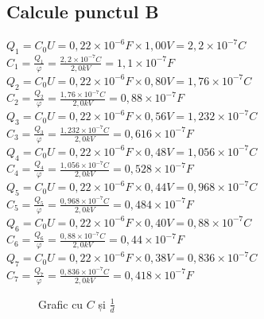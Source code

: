 \documentclass[12pt]{article}
\begin{document}
\subsection{Calcule punctul B}
$Q_{1} = C_{0}U = 0,22 \times 10^{-6}F \times 1,00V = 2,2 \times 10^{-7}C$\\
$C_{1} = \frac{Q_{1}}{\varphi} = \frac{2,2 \times 10^{-7}C}{2,0kV} = 1,1 \times 10^{-7}F$\\
$Q_{2} = C_{0}U = 0,22 \times 10^{-6}F \times 0,80V = 1,76 \times 10^{-7}C$\\
$C_{2} = \frac{Q_{2}}{\varphi} = \frac{1,76 \times 10^{-7}C}{2,0kV} = 0,88 \times 10^{-7}F$\\
$Q_{3} = C_{0}U = 0,22 \times 10^{-6}F \times 0,56V = 1,232 \times 10^{-7}C$\\
$C_{3} = \frac{Q_{3}}{\varphi} = \frac{1,232 \times 10^{-7}C}{2,0kV} = 0,616 \times 10^{-7}F$\\
$Q_{4} = C_{0}U = 0,22 \times 10^{-6}F \times 0,48V = 1,056 \times 10^{-7}C$\\
$C_{4} = \frac{Q_{4}}{\varphi} = \frac{1,056 \times 10^{-7}C}{2,0kV} = 0,528 \times 10^{-7}F$\\
$Q_{5} = C_{0}U = 0,22 \times 10^{-6}F \times 0,44V = 0,968 \times 10^{-7}C$\\
$C_{5} = \frac{Q_{5}}{\varphi} = \frac{0,968 \times 10^{-7}C}{2,0kV} = 0,484 \times 10^{-7}F$\\
$Q_{6} = C_{0}U = 0,22 \times 10^{-6}F \times 0,40V = 0,88 \times 10^{-7}C$\\
$C_{6} = \frac{Q_{6}}{\varphi} = \frac{0,88 \times 10^{-7}C}{2,0kV} = 0,44 \times 10^{-7}F$\\
$Q_{7} = C_{0}U = 0,22 \times 10^{-6}F \times 0,38V = 0,836 \times 10^{-7}C$\\
$C_{7} = \frac{Q_{7}}{\varphi} = \frac{0,836 \times 10^{-7}C}{2,0kV} = 0,418 \times 10^{-7}F$\\

\begin{figure}[H]
    \centering
    \caption{Grafic cu $C$ și $\frac{1}{d}$}
    \label{fig:C_vs_1_d}
\end{figure}
\end{document}
